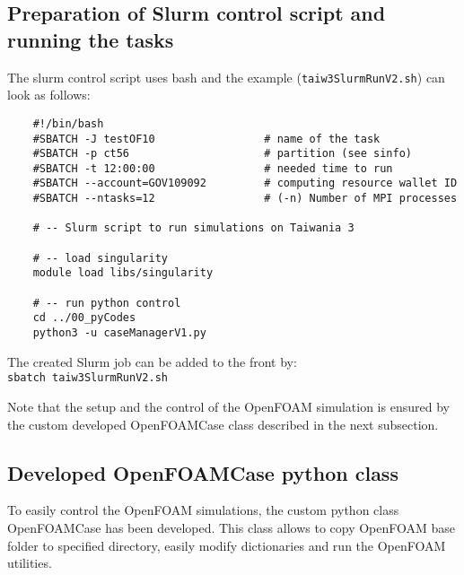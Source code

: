 \subsection{Preparation of Slurm control script and running the tasks}
\label{subsec:slurmCtrl}
The slurm control script uses bash and the example (\texttt{taiw3SlurmRunV2.sh}) can look as follows:
\begin{verbatim}
    #!/bin/bash
    #SBATCH -J testOF10                 # name of the task
    #SBATCH -p ct56                     # partition (see sinfo)
    #SBATCH -t 12:00:00                 # needed time to run
    #SBATCH --account=GOV109092         # computing resource wallet ID
    #SBATCH --ntasks=12                 # (-n) Number of MPI processes

    # -- Slurm script to run simulations on Taiwania 3

    # -- load singularity
    module load libs/singularity

    # -- run python control
    cd ../00_pyCodes
    python3 -u caseManagerV1.py
\end{verbatim}

The created Slurm job can be added to the front by:\\[0.2cm]
\indent\quad\quad\texttt{sbatch taiw3SlurmRunV2.sh}

Note that the setup and the control of the OpenFOAM simulation is ensured by the custom developed OpenFOAMCase class described in the next subsection.

\subsection{Developed OpenFOAMCase python class}
\label{subsec:ofCaseClass}
To easily control the OpenFOAM simulations, the custom python class OpenFOAMCase has been developed. This class allows to copy OpenFOAM base folder to specified directory, easily modify dictionaries and run the OpenFOAM utilities.

